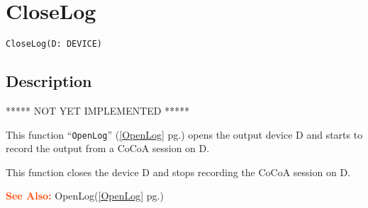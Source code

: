 \documentclass[a4paper]{mybook}
\newenvironment{command}{}{} %
\newcommand\SeeAlso{\par\textcolor{OrangeRed}{\textbf{\large See Also: }}}
\begin{document}
\section{CloseLog}
\label{CloseLog}
\begin{command} %


\begin{Verbatim}[label=syntax, rulecolor=\color{MidnightBlue},
frame=single]
CloseLog(D: DEVICE)
\end{Verbatim}


\subsection*{Description}

***** NOT YET IMPLEMENTED *****
\par 
This function ``\verb&OpenLog&'' (\ref{OpenLog} pg.\pageref{OpenLog}) opens the output device D and
starts to record the output from a CoCoA session on D.
\par 
This function closes the device D and stops recording the CoCoA session on D.

\SeeAlso %
  OpenLog(\ref{OpenLog} pg.\pageref{OpenLog})
\end{command} %
\end{document}
